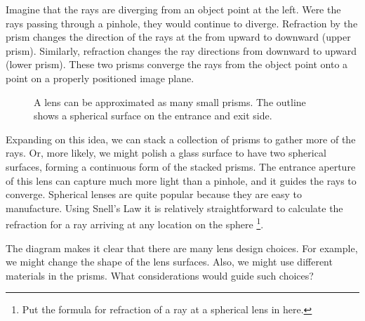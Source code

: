 \documentclass[
  letterpaper,
]{book}
\begin{document}
Imagine that the rays are diverging from an object point at the left.
Were the rays passing through a pinhole, they would continue to diverge.
Refraction by the prism changes the direction of the rays at the from
upward to downward (upper prism). Similarly, refraction changes the ray
directions from downward to upward (lower prism). These two prisms
converge the rays from the object point onto a point on a properly
positioned image plane.

\begin{figure}


\caption{\label{fig-thinlens-prism}A lens can be approximated as many
small prisms. The outline shows a spherical surface on the entrance and
exit side.}

\end{figure}%

Expanding on this idea, we can stack a collection of prisms to gather
more of the rays. Or, more likely, we might polish a glass surface to
have two spherical surfaces, forming a continuous form of the stacked
prisms. The entrance aperture of this lens can capture much more light
than a pinhole, and it guides the rays to converge. Spherical lenses are
quite popular because they are easy to manufacture. Using Snell's Law it
is relatively straightforward to calculate the refraction for a ray
arriving at any location on the sphere \footnote{Put the formula for
  refraction of a ray at a spherical lens in here.}.

The diagram makes it clear that there are many lens design choices. For
example, we might change the shape of the lens surfaces. Also, we might
use different materials in the prisms. What considerations would guide
such choices?
\end{document}

